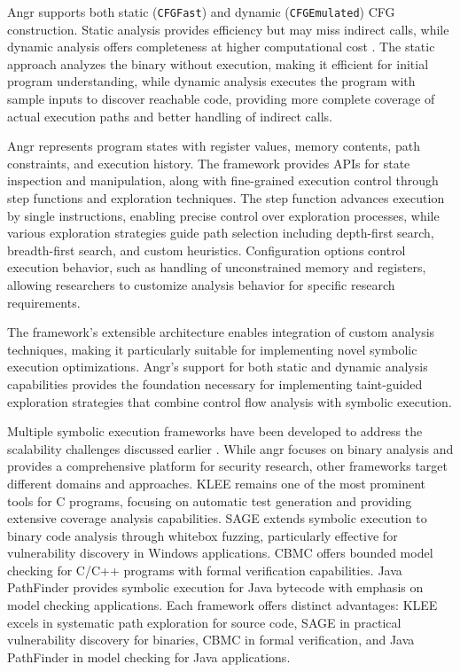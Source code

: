 Angr supports both static (\texttt{CFGFast}) and dynamic (\texttt{CFGEmulated}) CFG construction. Static analysis provides efficiency but may miss indirect calls, while dynamic analysis offers completeness at higher computational cost \cite{angr_documentation}. The static approach analyzes the binary without execution, making it efficient for initial program understanding, while dynamic analysis executes the program with sample inputs to discover reachable code, providing more complete coverage of actual execution paths and better handling of indirect calls.

Angr represents program states with register values, memory contents, path constraints, and execution history. The framework provides APIs for state inspection and manipulation, along with fine-grained execution control through step functions and exploration techniques. The step function advances execution by single instructions, enabling precise control over exploration processes, while various exploration strategies guide path selection including depth-first search, breadth-first search, and custom heuristics. Configuration options control execution behavior, such as handling of unconstrained memory and registers, allowing researchers to customize analysis behavior for specific research requirements.

The framework's extensible architecture enables integration of custom analysis techniques, making it particularly suitable for implementing novel symbolic execution optimizations. Angr's support for both static and dynamic analysis capabilities provides the foundation necessary for implementing taint-guided exploration strategies that combine control flow analysis with symbolic execution.

Multiple symbolic execution frameworks have been developed to address the scalability challenges discussed earlier \cite{baldoni_survey_2018}. While angr focuses on binary analysis and provides a comprehensive platform for security research, other frameworks target different domains and approaches. KLEE \cite{cadar_klee_2008} remains one of the most prominent tools for C programs, focusing on automatic test generation and providing extensive coverage analysis capabilities. SAGE \cite{godefroid_automated_2008} extends symbolic execution to binary code analysis through whitebox fuzzing, particularly effective for vulnerability discovery in Windows applications. CBMC \cite{clarke_behavioral_2003} offers bounded model checking for C/C++ programs with formal verification capabilities. Java PathFinder \cite{visser_model_2003} provides symbolic execution for Java bytecode with emphasis on model checking applications. Each framework offers distinct advantages: KLEE excels in systematic path exploration for source code, SAGE in practical vulnerability discovery for binaries, CBMC in formal verification, and Java PathFinder in model checking for Java applications.
